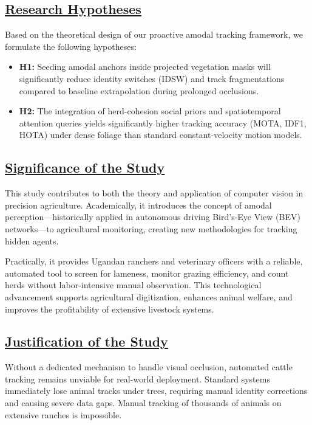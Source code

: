 \documentclass[12pt]{article}
\begin{document}
\subsection*{\underline{\textbf{Research Hypotheses}}}
Based on the theoretical design of our proactive amodal tracking framework, we formulate the following hypotheses:
\begin{itemize}
    \item \textbf{H1:} Seeding amodal anchors inside projected vegetation masks will significantly reduce identity switches (IDSW) and track fragmentations compared to baseline extrapolation during prolonged occlusions.
    \item \textbf{H2:} The integration of herd-cohesion social priors and spatiotemporal attention queries yields significantly higher tracking accuracy (MOTA, IDF1, HOTA) under dense foliage than standard constant-velocity motion models.
\end{itemize}

\subsection*{\underline{\textbf{Significance of the Study}}}
This study contributes to both the theory and application of computer vision in precision agriculture. Academically, it introduces the concept of amodal perception—historically applied in autonomous driving Bird's-Eye View (BEV) networks—to agricultural monitoring, creating new methodologies for tracking hidden agents. 

Practically, it provides Ugandan ranchers and veterinary officers with a reliable, automated tool to screen for lameness, monitor grazing efficiency, and count herds without labor-intensive manual observation. This technological advancement supports agricultural digitization, enhances animal welfare, and improves the profitability of extensive livestock systems.

\subsection*{\underline{\textbf{Justification of the Study}}}
Without a dedicated mechanism to handle visual occlusion, automated cattle tracking remains unviable for real-world deployment. Standard systems immediately lose animal tracks under trees, requiring manual identity corrections and causing severe data gaps. Manual tracking of thousands of animals on extensive ranches is impossible. 
\end{document}
